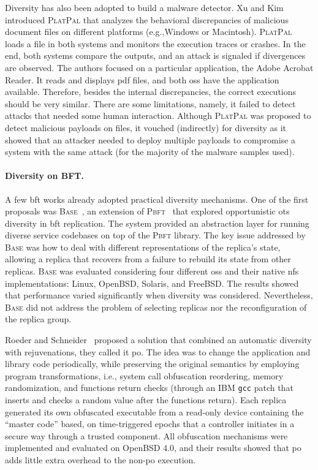 Diversity has also been adopted to build a malware detector. 
Xu and Kim~\cite{Xu:2017a} introduced \textsc{PlatPal} that analyzes the behavioral discrepancies of malicious document files on different platforms (e.g.,Windows or Macintosh).
\textsc{PlatPal} loads a file in both systems and monitors the execution traces or crashes. 
In the end, both systems compare the outputs, and an attack is signaled if divergences are observed.
The authors focused on a particular application, the Adobe Acrobat Reader.
It reads and displays pdf files, and both \glspl{os} have the application available.
Therefore, besides the internal discrepancies, the correct executions should be very similar.
There are some limitations, namely, it failed to detect attacks that needed some human interaction.
Although \textsc{PlatPal} was proposed to detect malicious payloads on files, it vouched (indirectly) for diversity as it showed that an attacker needed to deploy multiple payloads to compromise a system with the same attack (for the majority of the malware samples used).

\paragraph{Diversity on BFT.}
A few \gls{bft} works already adopted practical diversity mechanisms. 
One of the first proposals was \textsc{Base}~\cite{Castro:2003}, an extension of \textsc{Pbft}~\cite{Castro:1999} that explored opportunistic \gls{ots} diversity in \gls{bft} replication.
The system provided an abstraction layer for running diverse service codebases on top of the \textsc{Pbft} library.
The key issue addressed by \textsc{Base} was how to deal with different representations of the replica's state, allowing a replica that recovers from a failure to rebuild its state from other replicas. 
\textsc{Base} was evaluated considering four different \glspl{os} and their native \gls{nfs} implementations: Linux, OpenBSD, Solaris, and FreeBSD.
The results showed that performance varied significantly when diversity was considered.
Nevertheless, \textsc{Base} did not address the problem of selecting replicas nor the reconfiguration of the replica group.

Roeder and Schneider~\cite{Roeder:2010} proposed a solution that combined an automatic diversity with rejuvenations, they called it \gls{po}.
The idea was to change the application and library code periodically, while preserving the original semantics by employing program transformations, i.e., system call obfuscation reordering, memory randomization, and functions return checks (through an IBM \texttt{gcc} patch that inserts and checks a random value after the functions return).
Each replica generated its own obfuscated executable from a read-only device containing the ``master code'' based, on time-triggered epochs that a controller initiates in a secure way through a trusted component.
All obfuscation mechanisms were implemented and evaluated on OpenBSD 4.0, and their results showed that \gls{po} adds little extra overhead to the non-\gls{po} execution.


